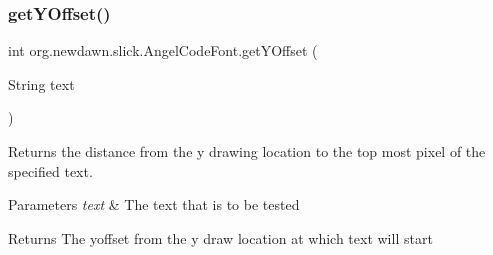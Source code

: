 \subsubsection{\texorpdfstring{get\+Y\+Offset()}{getYOffset()}}
{\footnotesize\ttfamily int org.\+newdawn.\+slick.\+Angel\+Code\+Font.\+get\+Y\+Offset (\begin{DoxyParamCaption}\item[{String}]{text }\end{DoxyParamCaption})\hspace{0.3cm}{\ttfamily [inline]}}

Returns the distance from the y drawing location to the top most pixel of the specified text.


\begin{DoxyParams}{Parameters}
{\em text} & The text that is to be tested \\
\hline
\end{DoxyParams}
\begin{DoxyReturn}{Returns}
The yoffset from the y draw location at which text will start 
\end{DoxyReturn}

